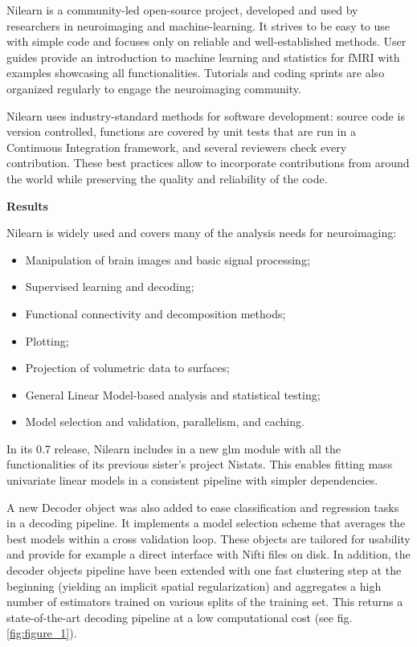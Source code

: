 \documentclass[a4paper]{article}
\begin{document}
\noindent Nilearn is a community-led open-source project, developed and used by researchers in neuroimaging and machine-learning. It strives to be easy to use with simple code and focuses only on reliable and well-established methods. User guides provide an introduction to machine learning and statistics for fMRI with examples showcasing all functionalities. Tutorials and coding sprints are also organized regularly to engage the neuroimaging community.

\medskip

\noindent Nilearn uses industry-standard methods for software development: source code is version controlled, functions are covered by unit tests that are run in a Continuous Integration framework, and several reviewers check every contribution. These best practices allow to incorporate contributions from around the world while preserving the quality and reliability of the code.

\bigskip

\noindent \textbf{Results}

\medskip

\noindent Nilearn is widely used and covers many of the analysis needs for neuroimaging:

\begin{itemize}
	\item Manipulation of brain images and basic signal processing;
	\item Supervised learning and decoding;
	\item Functional connectivity and decomposition methods;
	\item Plotting;
	\item Projection of volumetric data to surfaces;
	\item General Linear Model-based analysis and statistical testing;
	\item Model selection and validation, parallelism, and caching.
\end{itemize}

\noindent In its 0.7 release, Nilearn includes in a new glm module with all the functionalities of its previous sister’s project Nistats. This enables fitting mass univariate linear models in a consistent pipeline with simpler dependencies.

\medskip

\noindent A new Decoder object was also added to ease classification and regression tasks in a decoding pipeline. It implements a model selection scheme that averages the best models within a cross validation loop. These objects are tailored for usability and provide for example a direct interface with Nifti files on disk. In addition, the decoder objects pipeline have been extended with one fast clustering step at the beginning (yielding an implicit spatial regularization) and aggregates a high number of estimators trained on various splits of the training set. This returns a state-of-the-art decoding pipeline at a low computational cost (see fig. \ref{fig:figure_1}).
\end{document}
